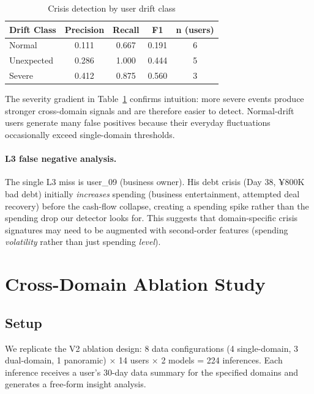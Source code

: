 \documentclass[11pt,a4paper]{article}
\newcommand{\yen}{¥}
\begin{document}
\begin{table}[H]
\centering
\caption{Crisis detection by user drift class}
\label{tab:crisis_drift}
\begin{tabular}{lcccc}
\toprule
\textbf{Drift Class} & \textbf{Precision} & \textbf{Recall} & \textbf{F1} & \textbf{n (users)} \\
\midrule
Normal     & 0.111 & 0.667 & 0.191 & 6 \\
Unexpected & 0.286 & 1.000 & 0.444 & 5 \\
Severe     & 0.412 & 0.875 & 0.560 & 3 \\
\bottomrule
\end{tabular}
\end{table}

The severity gradient in Table~\ref{tab:crisis_drift} confirms intuition:
more severe events produce stronger cross-domain signals and are therefore
easier to detect. Normal-drift users generate many false positives because
their everyday fluctuations occasionally exceed single-domain thresholds.

\paragraph{L3 false negative analysis.} The single L3 miss is user\_09
(business owner). His debt crisis (Day 38, \yen{}800K bad debt) initially
\emph{increases} spending (business entertainment, attempted deal recovery)
before the cash-flow collapse, creating a spending spike rather than the
spending drop our detector looks for. This suggests that domain-specific
crisis signatures may need to be augmented with second-order features
(spending \emph{volatility} rather than just spending \emph{level}).


\section{Cross-Domain Ablation Study}
\label{sec:ablation}

\subsection{Setup}

We replicate the V2 ablation design: 8 data configurations (4 single-domain,
3 dual-domain, 1 panoramic) $\times$ 14 users $\times$ 2 models = 224
inferences. Each inference receives a user's 30-day data summary for the
specified domains and generates a free-form insight analysis.
\end{document}
